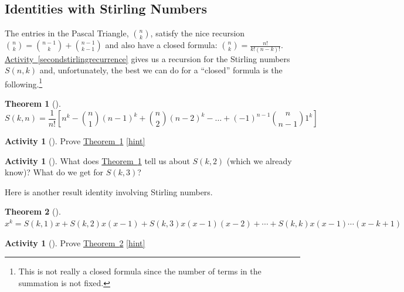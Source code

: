 \documentclass[10pt,]{book}
\theoremstyle{plain}
\newtheorem{theorem}{Theorem}[section]
\theoremstyle{definition}
\theoremstyle{definition}
\theoremstyle{definition}
\newtheorem{activity}[project]{Activity}
\numberwithin{equation}{chapter}
\begin{document}
\subsection[{Identities with Stirling Numbers}]{Identities with Stirling Numbers}\label{subsec-stirlingidentities}
\hypertarget{p-1440}{}%
The entries in the Pascal Triangle, \(\binom{n}{k}\), satisfy the nice recursion \(\binom{n}{k} = \binom{n - 1}{k} + \binom{n - 1}{k - 1}\) and also have a closed formula: \(\binom{n}{k} = \frac{n!}{k!(n - k)!}\). \hyperref[secondstirlingrecurrence]{Activity~\ref{secondstirlingrecurrence}} gives us a recursion for the Stirling numbers \(S(n,k)\) and, unfortunately, the best we can do for a ``closed'' formula is the following.\footnote{This is not really a closed formula since the number of terms in the summation is not fixed.\label{fn-19}}%
\begin{theorem}[{}]\label{thm-stirling-closed}
\hypertarget{p-1441}{}%
%
\begin{equation*}
S(k,n) = \frac{1}{n!}\left[n^{k} - \binom{n}{1} \left( n - 1 \right)^{k} + \binom{n}{2} \left( n - 2 \right)^{k} - \ldots + \left( - 1 \right)^{n - 1}\binom{n}{n - 1} 1^{k} \right] 
\end{equation*}
%
\end{theorem}
\begin{activity}[]\label{activity-278}
\hypertarget{p-1442}{}%
Prove \hyperref[thm-stirling-closed]{Theorem~\ref{thm-stirling-closed}}%
\hfill{\tiny\hyperlink{a-285}{[hint]}\hypertarget{q-285}{}}\end{activity}
\begin{activity}[]\label{activity-279}
\hypertarget{p-1446}{}%
What does \hyperref[thm-stirling-closed]{Theorem~\ref{thm-stirling-closed}} tell us about \(S(k, 2)\) (which we already know)?  What do we get for \(S(k,3)\)?%
\end{activity}
\hypertarget{p-1448}{}%
Here is another result identity involving Stirling numbers.%
\begin{theorem}[{}]\label{thm-stirling-polynomial}
\hypertarget{p-1449}{}%
\(x^{k} = S\left(k,1 \right)x + S\left(k,2 \right)x\left( x - 1 \right) + S\left(k,3 \right)x\left( x - 1 \right)\left( x - 2 \right) + \cdots
+ S\left(k,k \right)x\left( x - 1 \right)\cdots(x -k + 1)\)%
\end{theorem}
\begin{activity}[]\label{activity-280}
\hypertarget{p-1450}{}%
Prove \hyperref[thm-stirling-polynomial]{Theorem~\ref{thm-stirling-polynomial}}%
\hfill{\tiny\hyperlink{a-287}{[hint]}\hypertarget{q-287}{}}\end{activity}
\end{document}
